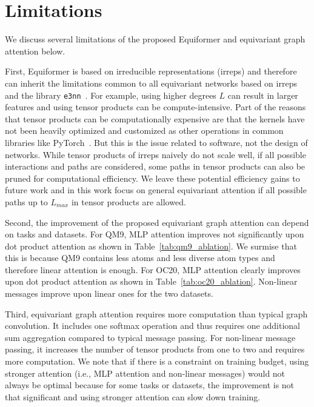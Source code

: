 \section{Limitations}
\label{appendix:sec:limitations}


We discuss several limitations of the proposed Equiformer and equivariant graph attention below.

First, Equiformer is based on irreducible representations (irreps) and therefore can inherit the limitations common to all equivariant networks based on irreps and the library \texttt{e3nn}~\citep{e3nn}.
For example, using higher degrees $L$ can result in larger features and using tensor products can be compute-intensive. 
Part of the reasons that tensor products can be computationally expensive are that the kernels have not been heavily optimized and customized as other operations in common libraries like PyTorch~\citep{pytorch}. 
But this is the issue related to software, not the design of networks. 
While tensor products of irreps naively do not scale well, if all possible interactions and paths are considered, some paths in tensor products can also be pruned for computational efficiency. 
We leave these potential efficiency gains to future work and in this work focus on general equivariant attention if all possible paths up to $L_{max}$ in tensor products are allowed.

Second,  the improvement of the proposed equivariant graph attention can depend on tasks and datasets. For QM9, MLP attention improves not significantly upon dot product attention as shown in Table~\ref{tab:qm9_ablation}. 
We surmise that this is because QM9 contains less atoms and less diverse atom types and therefore linear attention is enough. For OC20, MLP attention clearly improves upon dot product attention as shown in Table~\ref{tab:oc20_ablation}. Non-linear messages improve upon linear ones for the two datasets.

Third, equivariant graph attention requires more computation than typical graph convolution. 
It includes one softmax operation and thus requires one additional sum aggregation compared to typical message passing. For non-linear message passing, it increases the number of tensor products from one to two and requires more computation. 
We note that if there is a constraint on training budget, using stronger attention (i.e., MLP attention and non-linear messages) would not always be optimal because for some tasks or datasets, the improvement is not that significant and using stronger attention can slow down training. 

